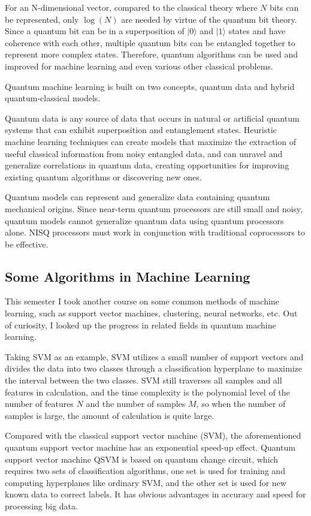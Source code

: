 \documentclass[11pt]{article}
\begin{document}
For an N-dimensional vector, compared to the classical theory where $N$ bits can be represented, only $\log(N)$ are needed by virtue of the quantum bit theory. Since a quantum bit can be in a superposition of $|0\rangle$ and $|1\rangle$ states and have coherence with each other, multiple quantum bits can be entangled together to represent more complex states. Therefore, quantum algorithms can be used and improved for machine learning and even various other classical problems.

Quantum machine learning is built on two concepts, quantum data and hybrid quantum-classical models.

Quantum data is any source of data that occurs in natural or artificial quantum systems that can exhibit superposition and entanglement states. Heuristic machine learning techniques can create models that maximize the extraction of useful classical information from noisy entangled data, and can unravel and generalize correlations in quantum data, creating opportunities for improving existing quantum algorithms or discovering new ones.

Quantum models can represent and generalize data containing quantum mechanical origins. Since near-term quantum processors are still small and noisy, quantum models cannot generalize quantum data using quantum processors alone. NISQ processors must work in conjunction with traditional coprocessors to be effective.

\subsection{Some Algorithms in Machine Learning}
\qquad This semester I took another course on some common methods of machine learning, such as support vector machines, clustering, neural networks, etc. Out of curiosity, I looked up the progress in related fields in quantum machine learning.

Taking SVM as an example, SVM utilizes a small number of support vectors and divides the data into two classes through a classification hyperplane to maximize the interval between the two classes. SVM still traverses all samples and all features in calculation, and the time complexity is the polynomial level of the number of features $N$ and the number of samples $M$, so when the number of samples is large, the amount of calculation is quite large.

Compared with the classical support vector machine (SVM), the aforementioned quantum support vector machine has an exponential speed-up effect. Quantum support vector machine QSVM is based on quantum change circuit, which requires two sets of classification algorithms, one set is used for training and computing hyperplanes like ordinary SVM, and the other set is used for new known data to correct labels. It has obvious advantages in accuracy and speed for processing big data.
\end{document}
